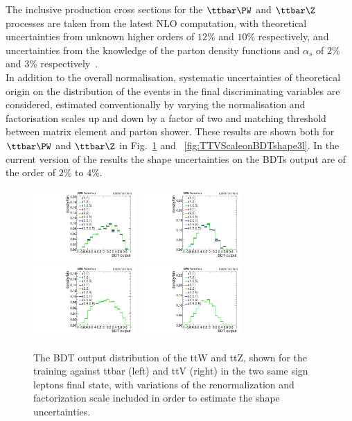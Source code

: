 The inclusive production cross sections for the $\ttbar\PW$ and $\ttbar\Z$ processes are taken
from the latest NLO computation, with theoretical uncertainties from unknown higher
orders of $12\%$ and $10\%$ respectively, and uncertainties from the knowledge of the parton
density functions and $\alpha_{s}$ of $2\%$ and $3\%$ respectively~\cite{YR4}.\\
In addition to the overall normalisation, systematic uncertainties of theoretical origin on the
distribution of the events in the final discriminating variables are considered, estimated
conventionally by varying the normalisation and factorisation scales up and down by a factor of two and
matching threshold between matrix element and parton shower. These
results are shown both for $\ttbar\PW$ and $\ttbar\Z$ in
Fig.~\ref{fig:TTVScaleonBDTshape2lss} and
~\ref{fig:TTVScaleonBDTshape3l}.
In the current version of the results the shape uncertainties on the BDTs output are of the order of $2\%$ to $4\%$.

\begin{figure}[htb]
	\centering 
\includegraphics[width=0.35\textwidth]{plots_irreduciblebkg/2lss/muR_muF_ttW/kinMVA_2lss_ttbar}
\includegraphics[width=0.35\textwidth]{plots_irreduciblebkg/2lss/muR_muF_ttW/kinMVA_2lss_ttV}
\includegraphics[width=0.35\textwidth]{plots_irreduciblebkg/2lss/muR_muF_ttZ/kinMVA_2lss_ttbar}
\includegraphics[width=0.35\textwidth]{plots_irreduciblebkg/2lss/muR_muF_ttZ/kinMVA_2lss_ttV}
	\caption{The BDT output distribution of the ttW and ttZ, shown for the training against ttbar 
	(left) and ttV (right) in the two same sign leptons final state, with variations of the
	renormalization and factorization scale included in order to estimate the shape uncertainties.}
	\label{fig:TTVScaleonBDTshape2lss}
\end{figure}

